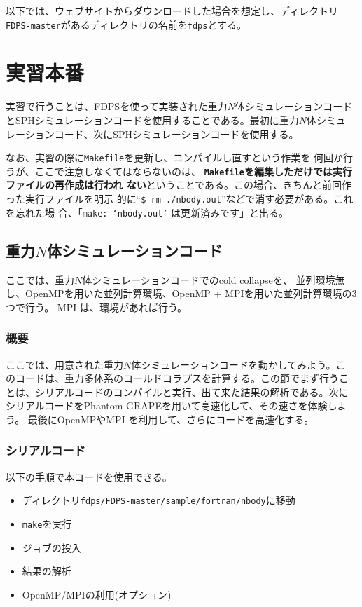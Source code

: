 \documentclass[12pt,a4paper,dvipdfmx]{jarticle}
\begin{document}
以下では、ウェブサイトからダウンロードした場合を想定し、ディレクトリ\texttt{FDPS-master}があるディレクトリの名前を\texttt{fdps}とする。

\section{実習本番}

実習で行うことは、FDPSを使って実装された重力$N$体シミュレーションコード
とSPHシミュレーションコードを使用することである。最初に重力$N$体シミュ
レーションコード、次にSPHシミュレーションコードを使用する。

なお、実習の際に\texttt{Makefile}を更新し、コンパイルし直すという作業を
何回か行うが、ここで注意しなくてはならないのは、
\textbf{\texttt{Makefile}を編集しただけでは実行ファイルの再作成は行われ
  ない}ということである。この場合、きちんと前回作った実行ファイルを明示
的に``\texttt{\$ rm ./nbody.out}''などで消す必要がある。これを忘れた場
合、「\texttt{make: `nbody.out'} は更新済みです」と出る。

\subsection{重力$N$体シミュレーションコード}
ここでは、重力$N$体シミュレーションコードでのcold collapseを、
並列環境無し、OpenMPを用いた並列計算環境、OpenMP + MPIを用いた並列計算環境の3つで行う。
MPI は、環境があれば行う。


\subsubsection{概要}

ここでは、用意された重力$N$体シミュレーションコードを動かしてみよう。こ
のコードは、重力多体系のコールドコラプスを計算する。この節でまず行うこ
とは、シリアルコードのコンパイルと実行、出て来た結果の解析である。次に
シリアルコードをPhantom-GRAPEを用いて高速化して、その速さを体験しよう。
最後にOpenMPやMPI を利用して、さらにコードを高速化する。

\subsubsection{シリアルコード}

以下の手順で本コードを使用できる。
\begin{itemize}
\item ディレクトリ\texttt{fdps/FDPS-master/sample/fortran/nbody}に移動
\item \texttt{make}を実行
\item ジョブの投入
\item 結果の解析
\item OpenMP/MPIの利用(オプション)
\end{itemize}
\end{document}
